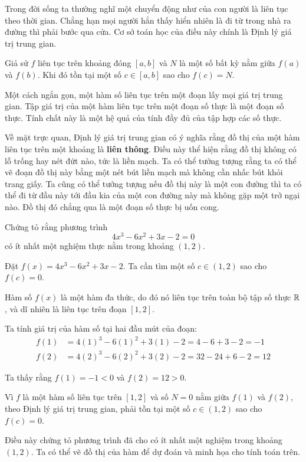 Trong đời sống ta thường nghĩ một chuyển động như của con người là liên tục theo thời gian. Chẳng hạn mọi người hẳn thấy hiển nhiên là đi từ trong nhà ra đường thì phải bước qua cửa. Cơ sở toán học của điều này chính là Định lý giá trị trung gian.

\begin{theorem}
	\label{thm:intermediate_value_theorem}
	Giả sử \( f \) liên tục trên khoảng đóng \( [a, b] \) và \( N \) là một số bất kỳ nằm giữa \( f(a) \) và \( f(b) \). Khi đó tồn tại một số \( c \in [a, b] \) sao cho \( f(c) = N \).
\end{theorem}

Một cách ngắn gọn, một hàm số liên tục trên một đoạn lấy mọi giá trị trung gian. Tập giá trị của một hàm liên tục trên một đoạn số thực là một đoạn số thực. Tính chất này là một hệ quả của tính đầy đủ của tập hợp các số thực.

Về mặt trực quan, Định lý giá trị trung gian có ý nghĩa rằng đồ thị của một hàm liên tục trên một khoảng là \textbf{liên thông}. Điều này thể hiện rằng đồ thị không có lỗ trống hay nét đứt nào, tức là liền mạch. Ta có thể tưởng tượng rằng ta có thể vẽ đoạn đồ thị này bằng một nét bút liền mạch mà không cần nhấc bút khỏi trang giấy. Ta cũng có thể tưởng tượng nếu đồ thị này là một con đường thì ta có thể đi từ đầu này tới đầu kia của một con đường này mà không gặp một trở ngại nào. Đồ thị đó chẳng qua là một đoạn số thực bị uốn cong.



\begin{example}
    Chứng tỏ rằng phương trình
    \[ 4x^3 - 6x^2 + 3x - 2 = 0 \]
    có ít nhất một nghiệm thực nằm trong khoảng \( (1, 2) \).
    \begin{solution}
        Đặt \( f(x) = 4x^3 - 6x^2 + 3x - 2 \). Ta cần tìm một số \( c \in (1, 2) \) sao cho \( f(c) = 0 \).
        
        Hàm số \( f(x) \) là một hàm đa thức, do đó nó liên tục trên toàn bộ tập số thực \( \mathbb{R} \), và dĩ nhiên là liên tục trên đoạn \( [1, 2] \).
        
        Ta tính giá trị của hàm số tại hai đầu mút của đoạn:
        \begin{align*}
            f(1) &= 4(1)^3 - 6(1)^2 + 3(1) - 2 = 4 - 6 + 3 - 2 = -1 \\
            f(2) &= 4(2)^3 - 6(2)^2 + 3(2) - 2 = 32 - 24 + 6 - 2 = 12
        \end{align*}
        
        Ta thấy rằng \( f(1) = -1 < 0 \) và \( f(2) = 12 > 0 \).
        
        Vì \( f \) là một hàm số liên tục trên \( [1, 2] \) và số \( N=0 \) nằm giữa \( f(1) \) và \( f(2) \), theo Định lý giá trị trung gian, phải tồn tại một số \( c \in (1, 2) \) sao cho \( f(c) = 0 \).
        
        Điều này chứng tỏ phương trình đã cho có ít nhất một nghiệm trong khoảng \( (1, 2) \). Ta có thể vẽ đồ thị của hàm để dự đoán và minh họa cho tính toán trên.
    \end{solution}
\end{example}

